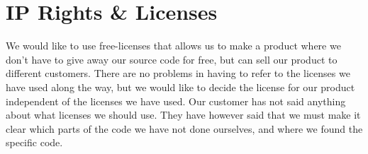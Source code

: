 
\section{IP Rights \& Licenses}
We would like to use free-licenses that allows us to make a product where we don’t have to give away our source code for free, but can sell our product to different customers. There are no problems in having to refer to the licenses we have used along the way, but we would like to decide the license for our product independent of the licenses we have used. 
\newline
\newline
Our customer has not said anything about what licenses we should use. They have however said that we must make it clear which parts of the code we have not done ourselves, and where we found the specific code.
\newline


